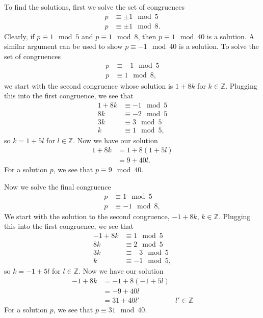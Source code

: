 \documentclass[12 pt]{amsart}
\begin{document}
  To find the solutions, first we solve
  the set of congruences
  \begin{align*}
    p &\equiv \pm 1 \mod 5 \\
    p &\equiv \pm 1 \mod 8.
  \end{align*}
  Clearly, if 
  $p \equiv 1 \mod 5$ 
  and 
  $p \equiv 1 \mod 8$,
  then 
  $p \equiv 1 \mod 40$ is a solution.
  A similar argument can be used to show
  $p \equiv -1 \mod 40$ is a solution.
  To solve the set of congruences
  \begin{align*}
    p &\equiv - 1 \mod 5 \\
    p &\equiv  1 \mod 8,
  \end{align*}
  we start with the second congruence whose solution is
  $1 + 8k$ for $k \in \mathbb{Z}$.
  Plugging this into the first congruence, we see that
  \begin{align*}
    1 + 8 k &\equiv -1 \mod 5 \\
     8 k &\equiv -2 \mod 5 \\
     3 k &\equiv 3 \mod 5 \\
     k &\equiv 1 \mod 5, 
  \end{align*}
  so $k = 1 + 5l$ for $l \in \mathbb{Z}$.
  Now we have our solution
  \begin{align*}
    1 + 8k &= 1 + 8(1 + 5l) \\ 
           &= 9 + 40l.
  \end{align*}
  For a solution $p$,
  we see that
  $p \equiv 9 \mod 40$.

  Now we solve the final congruence
  \begin{align*}
    p &\equiv  1 \mod 5 \\
    p &\equiv - 1 \mod 8,
  \end{align*}
  We start with the solution to the second congruence,
  $-1 + 8k$, $k \in \mathbb{Z}$.
  Plugging this into the first congruence, we see that
  \begin{align*}
    -1 + 8 k &\equiv 1 \mod 5 \\
     8 k &\equiv 2 \mod 5 \\
     3 k &\equiv -3 \mod 5 \\
     k &\equiv -1 \mod 5, 
  \end{align*}
  so $k = -1 + 5l$ for $l \in \mathbb{Z}$.
  Now we have our solution
  \begin{align*}
    -1 + 8k &= -1 + 8(-1 + 5l) \\ 
           &= -9 + 40l \\
           &= 31 + 40l' & l' \in \mathbb{Z}
  \end{align*}
  For a solution $p$,
  we see that
  $p \equiv 31 \mod 40$.
\end{document}
